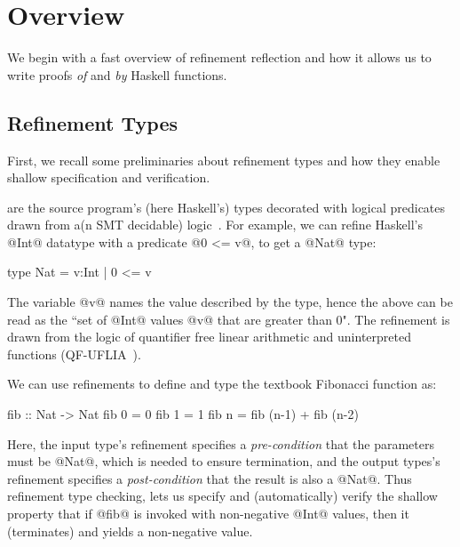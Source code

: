 \section{Overview}
\label{sec:overview}
\label{sec:examples}

We begin with a fast overview of refinement reflection and
how it allows us to write proofs \emph{of} and \emph{by}
Haskell functions.

\subsection{Refinement Types}

First, we recall some preliminaries about refinement types
and how they enable shallow specification and verification.

 are the source program's (here
Haskell's) types decorated with logical predicates drawn
from a(n SMT decidable) logic~\citep{ConstableS87,Rushby98}.
%
For example, we can refine Haskell's @Int@ datatype with a
predicate @0 <= v@, to get a @Nat@ type:
%
\begin{code}
  type Nat = {v:Int | 0 <= v}
\end{code}
%
The variable @v@ names the value described by the type,
hence the above can be read as the
``set of @Int@ values @v@ that are greater than 0".
The refinement is drawn from the logic of quantifier
free linear arithmetic and uninterpreted functions
(QF-UFLIA~\cite{SMTLIB2}).

%
We can use refinements to define and type the
textbook Fibonacci function as:
%
\begin{code}
  fib   :: Nat -> Nat
  fib 0 = 0
  fib 1 = 1
  fib n = fib (n-1) + fib (n-2)
\end{code}
%
Here, the input type's refinement specifies a
\emph{pre-condition} that the parameters must
be @Nat@, which is needed to ensure termination,
and the output types's refinement specifies a
\emph{post-condition} that the result is also a @Nat@.
%
Thus refinement type checking, lets us specify
and (automatically) verify the shallow property
that if @fib@ is invoked with non-negative
@Int@ values, then it (terminates) and yields
a non-negative value.

